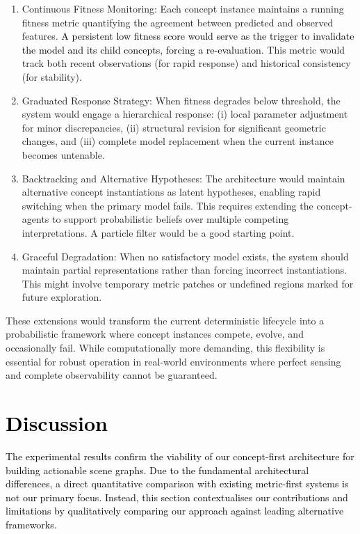 \documentclass[10pt,a4paper]{article}
\begin{document}
\begin{enumerate}
\item Continuous Fitness Monitoring: Each concept instance maintains a running fitness metric quantifying the agreement between predicted and observed features. \textcolor{black}{A persistent low fitness score would serve as the trigger to invalidate the model and its child concepts, forcing a re-evaluation.} This metric would track both recent observations (for rapid response) and historical consistency (for stability).

\item Graduated Response Strategy: When fitness degrades below threshold, the system would engage a hierarchical response: (i) local parameter adjustment for minor discrepancies, (ii) structural revision for significant geometric changes, and (iii) complete model replacement when the current instance becomes untenable.

\item Backtracking and Alternative Hypotheses: The architecture would maintain alternative concept instantiations as latent hypotheses, enabling rapid switching when the primary model fails. This requires extending the concept-agents to support probabilistic beliefs over multiple competing interpretations. A particle filter would be a good starting point.

\item Graceful Degradation: When no satisfactory model exists, the system should maintain partial representations rather than forcing incorrect instantiations. This might involve temporary metric patches or undefined regions marked for future exploration.
\end{enumerate}

These extensions would transform the current deterministic lifecycle into a probabilistic framework where concept instances compete, evolve, and occasionally fail. While computationally more demanding, this flexibility is essential for robust operation in real-world environments where perfect sensing and complete observability cannot be guaranteed.

\section{\textcolor{black}{Discussion}}

\textcolor{black}{The experimental results confirm the viability of our concept-first architecture for building actionable scene graphs. \textcolor{black}{Due to the fundamental architectural differences}, a direct quantitative comparison with existing metric-first systems is not our primary focus. Instead, this section contextualises our contributions and limitations by qualitatively comparing our approach against leading alternative frameworks.}
\end{document}
